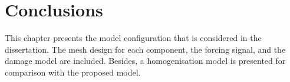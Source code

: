 \section{Conclusions}
\label{sec:conclusionsSimul}

This chapter presents the model configuration that is considered in the dissertation.
The mesh design for each component, the forcing signal, and the damage model are included.
Besides, a homogenisation model is presented for comparison with the proposed model.